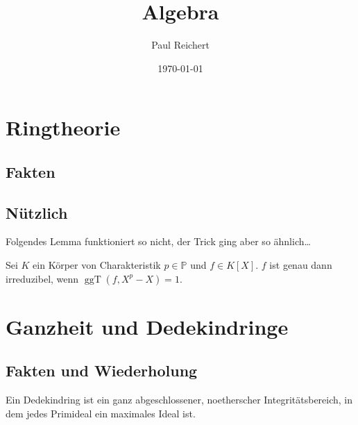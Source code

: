 \documentclass[ngerman, 11pt, a4paper, twoside, abstracton]{scrartcl}
\begin{document}
\renewcommand{\titlepagestyle}{empty}

\pagestyle{empty}

\subject{Notizen}
\title{Algebra}
\author{Paul Reichert}
\date{\today}

\maketitle


\pagestyle{headings}


\section{Ringtheorie}

\subsection{Fakten}

\subsection{Nützlich}

Folgendes Lemma funktioniert so nicht, der Trick ging aber so ähnlich\ldots
\begin{lemma}
  Sei $K$ ein Körper von Charakteristik $p\in\mathbb{P}$ und $f\in K\left[ X \right]$. $f$ ist genau dann irreduzibel, wenn $\operatorname{ggT}\left( f, X^p - X \right) = 1$.
\end{lemma}

\section{Ganzheit und Dedekindringe}

\subsection{Fakten und Wiederholung}

\begin{definition}
  Ein Dedekindring ist ein ganz abgeschlossener, noetherscher Integritätsbereich, in dem jedes Primideal ein maximales Ideal ist.
\end{definition}
\end{document}
